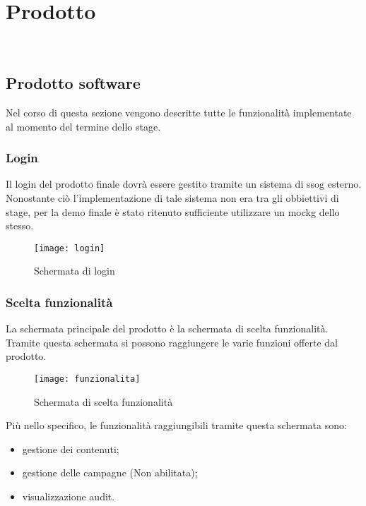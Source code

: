 
\chapter{Prodotto}
\label{cap:prodotto}

\\

\section{Prodotto software}
Nel corso di questa sezione vengono descritte tutte le funzionalità implementate al momento del termine dello stage.

\subsection{Login}
Il login del prodotto finale dovrà essere gestito tramite un sistema di \gls{ssog} esterno. Nonostante ciò l'implementazione di tale sistema non era tra gli obbiettivi di stage, per la demo finale è stato ritenuto sufficiente utilizzare un \gls{mockg} dello stesso. 
\begin{figure}[h]
    \begin{center}
    \texttt{[image: login]}
    \caption{Schermata di login}
    \label{fig:figure20}
    \end{center}
\end{figure}

\subsection{Scelta funzionalità}
La schermata principale del prodotto è la schermata di scelta funzionalità. Tramite questa schermata si possono raggiungere le varie funzioni offerte dal prodotto.
\begin{figure}[h]
    \begin{center}
    \texttt{[image: funzionalita]}
    \caption{Schermata di scelta funzionalità}
    \label{fig:figure21}
    \end{center}
\end{figure}
Più nello specifico, le funzionalità raggiungibili tramite questa schermata sono:
\begin{itemize}
    \item gestione dei contenuti;
    \item gestione delle campagne (Non abilitata);
    \item visualizzazione audit.
\end{itemize}

